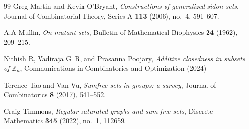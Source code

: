 \documentclass[12pt,a4paper]{article}
\begin{document}
\begin{thebibliography}{99}
Greg Martin and Kevin O’Bryant, \emph{Constructions of generalized sidon
  sets}, Journal of Combinatorial Theory, Series A \textbf{113} (2006), no.~4,
  591--607.

A.A Mullin, \emph{On mutant sets}, Bulletin of Mathematical Biophysics
  \textbf{24} (1962), 209–215.

Nithish R, Vadiraja G~R, and Prasanna Poojary, \emph{Additive closedness in
  subsets of $\mathbb{Z}_n$}, Communications in Combinatorics and Optimization
  (2024).

Terence Tao and Van Vu, \emph{Sumfree sets in groups: a survey}, Journal of
  Combinatorics \textbf{8} (2017), 541–552.

Craig Timmons, \emph{Regular saturated graphs and sum-free sets}, Discrete
  Mathematics \textbf{345} (2022), no.~1, 112659.



	\end{thebibliography}
\end{document}
